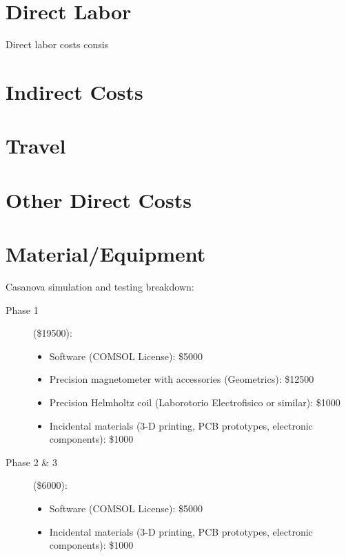 \section{Direct Labor}
Direct labor costs consis
\section{Indirect Costs}
\section{Travel}
\section{Other Direct Costs}
\section{Material/Equipment}

Casanova simulation and testing breakdown:
\begin{description}
\item [Phase 1] (\$19500):
  \begin{itemize}
  \item Software (COMSOL License): \$5000
  \item Precision magnetometer with accessories (Geometrics): \$12500
  \item Precision Helmholtz coil (Laborotorio Electrofisico or similar): \$1000
  \item Incidental materials (3-D printing, PCB prototypes, electronic components): \$1000
  \end{itemize}
\item [Phase 2 \& 3] (\$6000):
  \begin{itemize}
  \item Software (COMSOL License): \$5000
  \item Incidental materials (3-D printing, PCB prototypes, electronic components): \$1000
  \end{itemize}  
\end{description}

